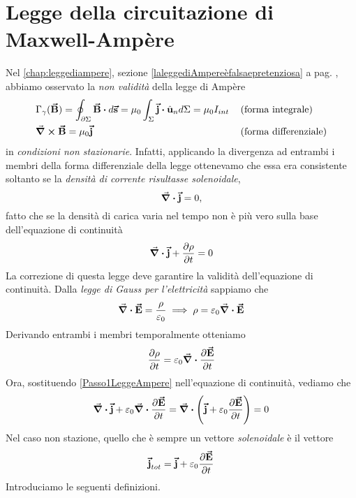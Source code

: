 \section{Legge della circuitazione di Maxwell-Ampère}
Nel \autoref{chap:leggediampere}, sezione \ref{laleggediAmpereèfalsaepretenziosa} a pag. \pageref{laleggediAmpereèfalsaepretenziosa}, abbiamo osservato la \textit{non validità} della legge di Ampère
\begin{align*}
	&\Gamma_{\gamma}(\vba{B})=\oint_{\partial \Sigma} \vba{B}\vdot d\vba{s}=\mu_0\int_{\Sigma}\vba{j}\vdot\vbh{u}_nd\Sigma=\mu_0 I_{int}	&& \left(\text{forma integrale}\right)\\
	&\curl{\vba{B}}=\mu_0\vba{j}	&& \left(\text{forma differenziale}\right)\\
\end{align*}
in \textit{condizioni non stazionarie}. Infatti, applicando la divergenza ad entrambi i membri della forma differenziale della legge ottenevamo che essa era consistente soltanto se la \textit{densità di corrente risultasse solenoidale},
\begin{equation}
	\div{\vb*{\va{j}}}=0,
\end{equation}
fatto che se la densità di carica varia nel tempo non è più vero sulla base dell'equazione di continuità
\begin{equation*}
	\div{\vb*{\va{j}}}+\pdv{\rho}{t}=0
\end{equation*}
La correzione di questa legge deve garantire la validità dell'equazione di continuità.
Dalla \textit{legge di Gauss per l'elettricità} sappiamo che
\begin{equation*}
	\div{\vb*{\va{E}}}=\frac{\rho}{\varepsilon_0}\implies \rho=\varepsilon_0\div{\vb*{\va{E}}}
\end{equation*}
Derivando entrambi i membri temporalmente otteniamo
\begin{equation}
	\pdv{\rho}{t}=\varepsilon_0\div{\pdv{\vb*{\va{E}}}{t}}\label{Passo1LeggeAmpere}
\end{equation}
Ora, sostituendo \eqref{Passo1LeggeAmpere} nell'equazione di continuità, vediamo che
\begin{equation}
	\div{\vb*{\va{j}}}+\varepsilon_0\div{\pdv{\vb*{\va{E}}}{t}}=\div{\left(\vb*{\va{j}}+\varepsilon_0\pdv{\vb*{\va{E}}}{t}\right)}=0
\end{equation}
Nel caso non stazione, quello che è sempre un vettore \textit{solenoidale} è il vettore
\begin{equation*}
	\vb*{\va{j}}_{tot}=\vb*{\va{j}}+\varepsilon_0\pdv{\vb*{\va{E}}}{t}
\end{equation*}
Introduciamo le seguenti definizioni.
